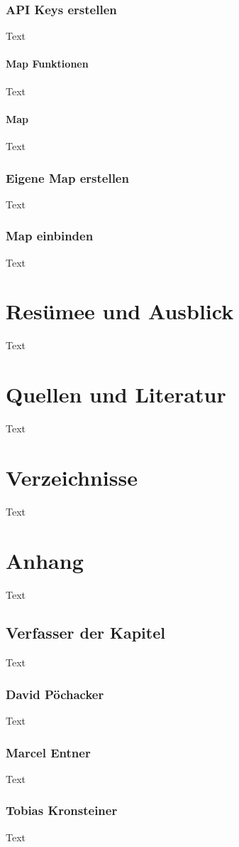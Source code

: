 \subsection{API Keys erstellen}
Text
\subsubsection{Map Funktionen}
Text
\subsubsection{Map}
Text
\subsection{Eigene Map erstellen}
Text
\subsection{Map einbinden}
Text





\chapter{Resümee und Ausblick}
Text

\chapter{Quellen und Literatur}
Text

\chapter{Verzeichnisse}
Text

\chapter{Anhang}
Text
\section{Verfasser der Kapitel}
Text
\subsection{David Pöchacker}
Text
\subsection{Marcel Entner}
Text
\subsection{Tobias Kronsteiner}
Text
